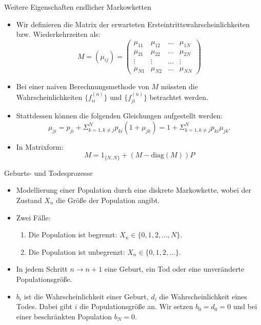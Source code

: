 \documentclass{beamer}
\begin{document}
\begin{frame}{Weitere Eigenschaften endlicher Markowketten}
  \begin{itemize}
  \item Wir definieren die Matrix der erwarteten Ersteintrittswahrscheinlichkeiten bzw{.} Wiederkehrzeiten als:
    \[
      M = (μ_{ij}) = \begin{pmatrix}
        μ_{11} & μ_{12} & \dots & μ_{1N} \\
        μ_{21} & μ_{22} & \dots & μ_{2N} \\
        \vdots & \vdots & \dots & \vdots \\
        μ_{N1} & μ_{N2} & \dots & μ_{NN}
      \end{pmatrix}
    \]
  \item Bei einer naiven Berechnungsmethode von $M$ müssten die Wahrscheinlichkeiten $\{f_{ii}^{(n)}\}$ und $\{f_{ji}^{(n)}\}$ betrachtet werden.
  \item Stattdessen können die folgenden Gleichungen aufgestellt werden:
    \[
      μ_{ji} = p_{ji} + Σ_{k=1,k≠j}^Np_{ki}(1+μ_{jk}) = 1+Σ_{k=1,k≠j}^Np_{ki}μ_{jk}.
    \]
  \item In Matrixform:
    \[
      M = 1_{\{N,N\}} + (M - \text{diag}(M))P
    \]
  \end{itemize}
\end{frame}
\begin{frame}{Geburts- und Todesprozesse}
  \begin{itemize}
  \item Modellierung einer Population durch eine diskrete Markowkette, wobei der Zustand $X_n$ die Größe der Population angibt.
  \item Zwei Fälle:
    \begin{enumerate}
    \item Die Population ist begrenzt: $X_n \in \{0,1,2,\dots,N\}$.
    \item Die Population ist unbegrenzt: $X_n \in \{0,1,2,\dots\}$.
    \end{enumerate}
  \item In jedem Schritt $n → n+1$ eine Geburt, ein Tod oder eine unveränderte Populationsgröße.
  \item $b_i$ ist die Wahrscheinlichkeit einer Geburt, $d_i$ die Wahrscheinlichkeit eines Todes. Dabei gibt $i$ die Populationsgröße an. Wir setzen $b_0 = d_0 = 0$ und bei einer beschränkten Population $b_N = 0$.
  \end{itemize}
\end{frame}
\end{document}
